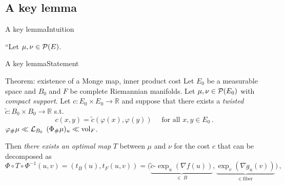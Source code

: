 \documentclass[9pt,xcolor={dvipsnames}]{beamer}
\begin{document}
\subsection{A key lemma}
\begin{frame}{A key lemma}{Intuition}
    \begin{center}
        ``Let $\mu,\nu\in \mathcal{P}(E)$. 
    \end{center}
    \begin{figure}[!h]
        \centering
        
    \end{figure}
\end{frame}
\begin{frame}{A key lemma}{Statement}
    \begin{block}{Theorem: existence of a Monge map, inner product cost}
        Let $E_0$ be a measurable space and $B_0$ and $F$ be complete Riemannian manifolds.
    Let $\mu,\nu \in \mathcal{P}(E_0)$ with \emph{compact support}.
    Let $c: E_0 \times E_0 \to \mathbb{R}$ and suppose that there exists a \emph{twisted} $\tilde c: B_0 \times B_0 \to \mathbb{R}$ s.t.
    \emph{\[ c(x,y)=\tilde c(\varphi(x),\varphi(y))\quad \text{ for all } x,y\in E_0\,.\]}
     \emph{$\varphi_\#\mu\ll\mathcal{L}_{B_0}$}  \emph{$(\Phi_\#\mu)_{u}\ll\operatorname{vol}_F$}.

    Then \emph{there exists an optimal map} $T$ between $\mu$ and $\nu$ for the cost $c$ that can be decomposed as
    \begin{equation*}
    \Phi \circ T\circ \Phi^{-1}(u,v)=(t_ B (u),t_ F (u,v))=\Big(\underbrace{\tilde c\text{-}\exp_u(\nabla f(u))}_{\in\ B}, \underbrace{\exp_v(\nabla g_u(v))}_{\in\ \text{fiber}}\Big)\,,
    \end{equation*}
    \end{block}
\end{frame}
\end{document}

